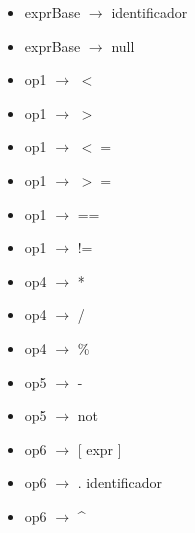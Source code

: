 \documentclass[11pt]{article}
\begin{document}
\begin{itemize}
            \item exprBase $\rightarrow$ identificador
            \item exprBase $\rightarrow$ null
            \item op1 $\rightarrow$ $<$
            \item op1 $\rightarrow$ $>$
            \item op1 $\rightarrow$ $<=$
            \item op1 $\rightarrow$ $>=$
            \item op1 $\rightarrow$ ==
            \item op1 $\rightarrow$ !=
            \item op4 $\rightarrow$ *
            \item op4 $\rightarrow$ /
            \item op4 $\rightarrow$ \%
            \item op5 $\rightarrow$ -
            \item op5 $\rightarrow$ not
            \item op6 $\rightarrow$ [ expr ]
            \item op6 $\rightarrow$ . identificador
            \item op6 $\rightarrow$ \^{}
        \end{itemize}
\end{document}
